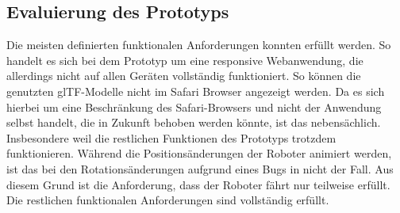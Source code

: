 \subsection{Evaluierung des Prototyps}
Die meisten definierten funktionalen Anforderungen konnten erfüllt werden. So handelt es sich bei dem Prototyp um eine responsive Webanwendung, die allerdings nicht auf allen Geräten vollständig funktioniert. So können die genutzten \ac{glTF}-Modelle nicht im Safari Browser angezeigt werden. Da es sich hierbei um eine Beschränkung des Safari-Browsers und nicht der Anwendung selbst handelt, die in Zukunft behoben werden könnte, ist das nebensächlich. Insbesondere weil die restlichen Funktionen des Prototyps trotzdem funktionieren. Während die Positionsänderungen der Roboter animiert werden, ist das bei den Rotationsänderungen aufgrund eines Bugs in \deckgl{} nicht der Fall. Aus diesem Grund ist die Anforderung, dass der Roboter fährt nur teilweise erfüllt. Die restlichen funktionalen Anforderungen sind vollständig erfüllt.

